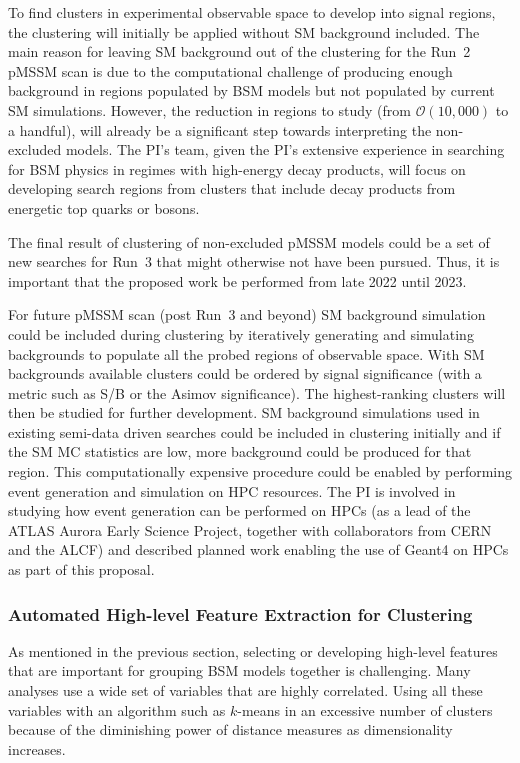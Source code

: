 \documentclass[letter, USenglish, 11pt, subfigure]{article}
\begin{document}
To find clusters in experimental observable space to develop into signal regions, the clustering will initially be applied without SM background included. The main reason for leaving SM background out of the clustering for the Run~2 pMSSM scan is due to the computational challenge of producing enough background in regions populated by BSM models but not populated by current SM simulations. However, the reduction in regions to study (from $\mathcal{O}(10,000)$ to a handful), will already be a significant step towards interpreting the non-excluded models. The PI's team, given the PI's extensive experience in searching for BSM physics in regimes with high-energy decay products, will focus on developing search regions from clusters that include decay products from energetic top quarks or bosons. 

The final result of clustering of non-excluded pMSSM models could be a set of new searches for Run~3 that might otherwise not have been pursued. Thus, it is important that the proposed work be performed from late 2022 until 2023.

For future pMSSM scan (post Run~3 and beyond) SM background simulation could be included during clustering by iteratively generating and simulating backgrounds to populate all the probed regions of observable space. With SM backgrounds available clusters could be ordered by signal significance (with a metric such as S/B or the Asimov significance). The highest-ranking clusters will then be studied for further development. SM background simulations used in existing semi-data driven searches could be included in clustering initially and if the SM MC statistics are low, more background could be produced for that region. This computationally expensive procedure could be enabled by performing event generation and simulation on HPC resources. The PI is involved in studying how event generation can be performed on HPCs (as a lead of the ATLAS Aurora Early Science Project, together with collaborators from CERN and the ALCF) and described planned work enabling the use of Geant4 on HPCs as part of this proposal. 


\subsubsection{Automated High-level Feature Extraction for Clustering}
As mentioned in the previous section, selecting or developing high-level features that are important for grouping BSM models together is challenging. Many analyses use a wide set of variables that are highly correlated. Using all these variables with an algorithm such as $k$-means in an excessive number of clusters because of the diminishing power of distance measures as dimensionality increases. 
\end{document}

